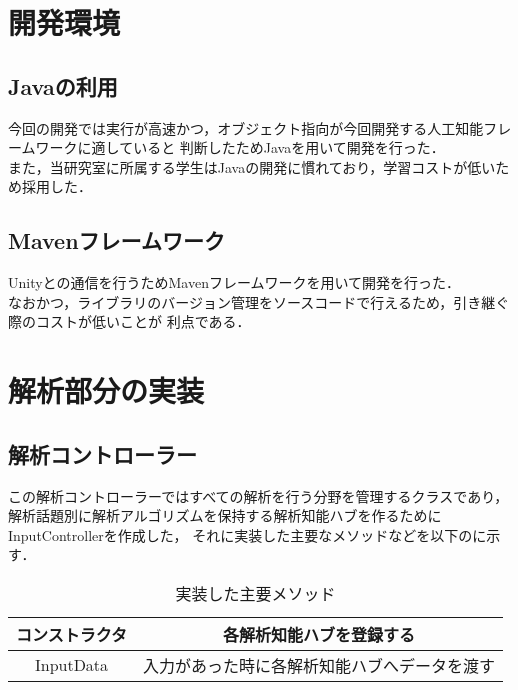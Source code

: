 
\section{開発環境}
\subsection{Javaの利用}
今回の開発では実行が高速かつ，オブジェクト指向が今回開発する人工知能フレームワークに適していると
判断したためJavaを用いて開発を行った．\\
また，当研究室に所属する学生はJavaの開発に慣れており，学習コストが低いため採用した．\\

\subsection{Mavenフレームワーク}
Unityとの通信を行うためMavenフレームワークを用いて開発を行った．\\
なおかつ，ライブラリのバージョン管理をソースコードで行えるため，引き継ぐ際のコストが低いことが
利点である．\\

\section{解析部分の実装}
\subsection{解析コントローラー}
この解析コントローラーではすべての解析を行う分野を管理するクラスであり，
解析話題別に解析アルゴリズムを保持する解析知能ハブを作るためにInputControllerを作成した，
それに実装した主要なメソッドなどを以下のに示す．\\

\begin{table}[tbh]
	\caption{実装した主要メソッド} \label{tab:InputController}
	\begin{center}
		\begin{tabular}[htb]{c|c}
		\hline
		コンストラクタ & 各解析知能ハブを登録する \\
		\hline
		InputData & 入力があった時に各解析知能ハブへデータを渡す \\
		\hline
		\end{tabular}
	\end{center}
\end{table}


